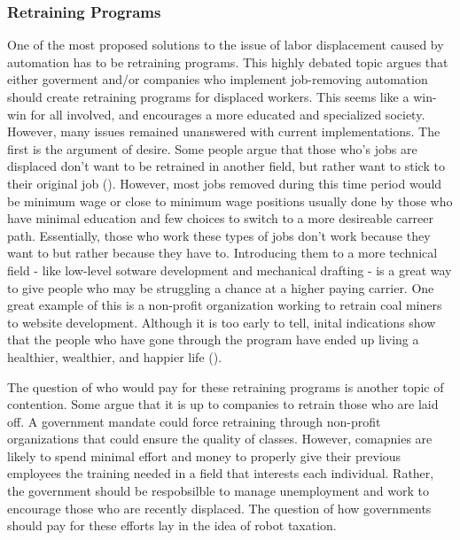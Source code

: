 \subsubsection{Retraining Programs}
One of the most proposed solutions to the issue of labor displacement caused by automation has to be retraining programs. This highly debated topic argues that either goverment and/or companies who implement job-removing automation should create retraining programs for displaced workers. This seems like a win-win for all involved, and encourages a more educated and specialized society. However, many issues remained unanswered with current implementations. The first is the argument of desire. Some people argue that those who's jobs are displaced don't want to be retrained in another field, but rather want to stick to their original job (\cite{miller2017beatRobots}). However, most jobs removed during this time period would be minimum wage or close to minimum wage positions usually done by those who have minimal education and few choices to switch to a more desireable carreer path. Essentially, those who work these types of jobs don't work because they want to but rather because they have to. Introducing them to a more technical field - like low-level sotware development and mechanical drafting - is a great way to give people who may be struggling a chance at a higher paying carrier. One great example of this is a non-profit organization working to retrain coal miners to website development. Although it is too early to tell, inital indications show that the people who have gone through the program have ended up living a healthier, wealthier, and happier life (\cite{phamRetrainingUnemployed}).

The question of who would pay for these retraining programs is another topic of contention. Some argue that it is up to companies to retrain those who are laid off. A government mandate could force retraining through non-profit organizations that could ensure the quality of classes. However, comapnies are likely to spend minimal effort and money to properly give their previous employees the training needed in a field that interests each individual. Rather, the government should be respobsilble to manage unemployment and work to encourage those who are recently displaced. The question of how governments should pay for these efforts lay in the idea of robot taxation. 

